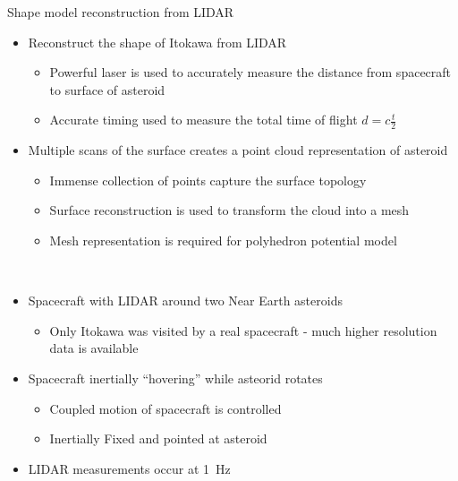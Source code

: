 \documentclass[final, usenames, dvipsnames]{beamer}
\newlength{\twocolwidth}
\begin{document}
\begin{frame}[t]
\begin{columns}[T,onlytextwidth]
\begin{column}{\twocolwidth}
\begin{block}{Shape model reconstruction from LIDAR} %
    \begin{minipage}[t]{0.5\columnwidth}
    \begin{itemize}
        \item Reconstruct the shape of Itokawa from LIDAR
            \begin{itemize}
                \item Powerful laser is used to accurately measure the distance from spacecraft to surface of asteroid
                \item Accurate timing used to measure the total time of flight \( d = c \frac{t}{2} \)
            \end{itemize}
        \item Multiple scans of the surface creates a point cloud representation of asteroid
        \begin{itemize}
            \item Immense collection of points capture the surface topology
            \item Surface reconstruction is used to transform the cloud into a mesh 
            \item Mesh representation is required for polyhedron potential model
        \end{itemize}
    \end{itemize}
    \end{minipage}~
    \begin{minipage}[t]{0.48\columnwidth}
    \begin{itemize}
        \item Spacecraft with LIDAR around two Near Earth asteroids
            \begin{itemize}
                \item Only Itokawa was visited by a real spacecraft - much higher resolution data is available
            \end{itemize}
        \item Spacecraft inertially ``hovering'' while asteorid rotates 
            \begin{itemize}
                \item Coupled motion of spacecraft is controlled 
                \item Inertially Fixed and pointed at asteroid
            \end{itemize}
        \item LIDAR measurements occur at \SI{1}{\hertz} 

\end{itemize}
\end{minipage}
\end{block}
\end{column}
\end{columns}
\end{frame}
\end{document}

